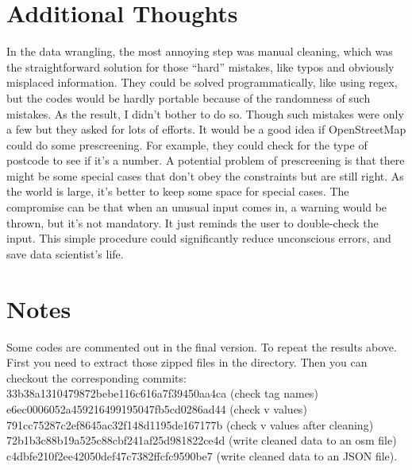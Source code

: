 \documentclass[12pt]{article}
\begin{document}
\section{Additional Thoughts}
In the data wrangling, the most annoying step was manual cleaning, which was the straightforward solution for those ``hard'' mistakes, like typos and obviously misplaced information. They could be solved programmatically, like using regex, but the codes would be hardly portable because of the randomness of such mistakes. As the result, I didn't bother to do so. Though such mistakes were only a few but they asked for lots of efforts. It would be a good idea if OpenStreetMap could do some prescreening. For example, they could check for the type of postcode to see if it's a number. A potential problem of prescreening is that there might be some special cases that don't obey the constraints but are still right. As the world is large, it's better to keep some space for special cases. The compromise can be that when an unusual input comes in, a warning would be thrown, but it's not mandatory. It just reminds the user to double-check the input. This simple procedure could significantly reduce unconscious errors, and save data scientist's life.

\section{Notes}
Some codes are commented out in the final version. To repeat the results above. First you need to extract those zipped files in the directory. Then you can checkout the corresponding commits:\\
33b38a1310479872bebe116c616a7f39450aa4ca (check tag names)\\
e6ec0006052a459216499195047fb5cd0286ad44 (check v values)\\
791cc75287c2ef8645ac32f148d1195de167177b (check v values after cleaning)\\
72b1b3c88b19a525c88cbf241af25d981822ce4d (write cleaned data to an osm file)\\
c4dbfe210f2ee42050def47c7382ffcfc9590be7 (write cleaned data to an JSON file).
\end{document}
